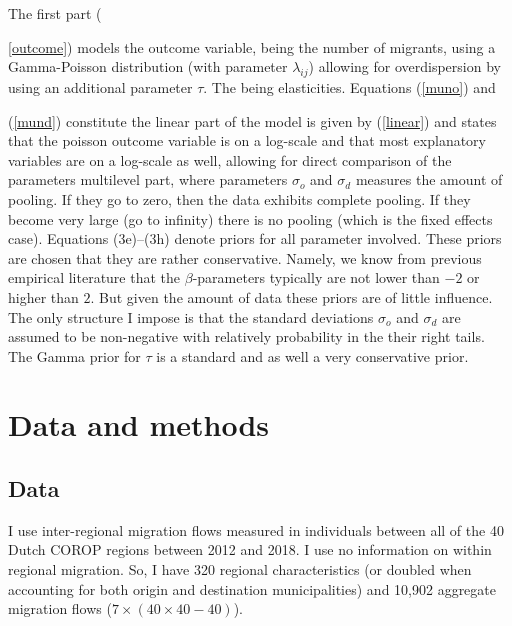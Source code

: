 \documentclass[a4paper,fleqn]{cas-dc}
\begin{document}
The first part ({\ref{outcome}) models the outcome variable, being the number of
  migrants, using a Gamma-Poisson distribution (with parameter $\lambda_{ij}$)
  allowing for overdispersion by using an additional parameter $\tau$. The being
  elasticities. Equations (\ref{muno}) and {(\ref{mund}) constitute the linear
    part of the model is given by (\ref{linear}) and states that the poisson
    outcome variable is on a log-scale and that most explanatory variables are
    on a log-scale as well, allowing for direct comparison of the parameters
    multilevel part, where parameters $\sigma_o$ and $\sigma_d$ measures the
    amount of pooling. If they go to zero, then the data exhibits complete
    pooling. If they become very large (go to infinity) there is no pooling
    (which is the fixed effects case). Equations (3e)--(3h) denote priors for
    all parameter involved. These priors are chosen that they are rather
    conservative. Namely, we know from previous empirical literature that the
    $\beta$-parameters typically are not lower than $-2$ or higher than $2$. But
    given the amount of data these priors are of little influence. The only
    structure I impose is that the standard deviations $\sigma_o$ and $\sigma_d$
    are assumed to be non-negative with relatively probability in the their
    right tails. The Gamma prior for $\tau$ is a standard and as well a very
    conservative prior.

\section{Data and methods}

\subsection{Data}

I use inter-regional migration flows measured in individuals between
all of the 40 Dutch COROP regions between 2012 and 2018. I use no information on
within regional migration. So, I have 320 regional
characteristics (or doubled when accounting for both origin and destination
municipalities) and 10,902 aggregate migration flows ($7 \times (40 \times 40 - 40)$).

}}
\end{document}
